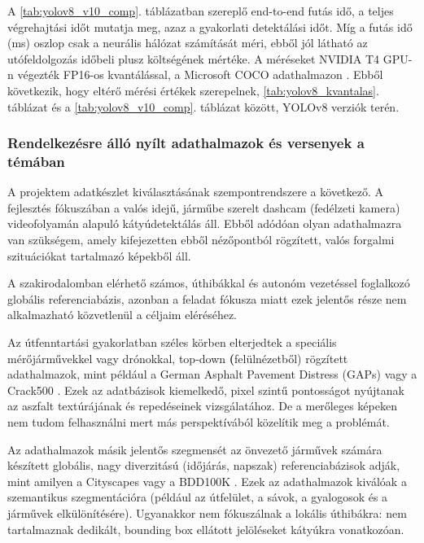 A \ref{tab:yolov8_v10_comp}. táblázatban szereplő end-to-end futás
idő, a teljes végrehajtási időt mutatja meg, azaz a gyakorlati
detektálási időt. Míg a futás idő (ms) oszlop csak a neurális hálózat
számítását méri, ebből jól látható az utófeldolgozás időbeli plusz
költségének mértéke. A méréseket NVIDIA T4 GPU-n végezték FP16-os
kvantálással, a Microsoft COCO adathalmazon \cite{wangYOLOv10RealTimeEndtoEnd2024}. Ebből következik,
hogy eltérő mérési értékek szerepelnek, \ref{tab:yolov8_kvantalas}. táblázat és a \ref{tab:yolov8_v10_comp}. táblázat között, YOLOv8 verziók terén.

\subsubsection{Rendelkezésre álló nyílt adathalmazok és versenyek a témában} %
\label{rendelkezesre-allo-nyilt-adathalmazok-es-versenyek-a-temaban}

A projektem adatkészlet kiválasztásának szempontrendszere a következő. A
fejlesztés fókuszában a valós idejű, járműbe szerelt dashcam (fedélzeti
kamera) videofolyamán alapuló kátyúdetektálás áll. Ebből adódóan olyan
adathalmazra van szükségem, amely kifejezetten ebből nézőpontból
rögzített, valós forgalmi szituációkat tartalmazó képekből áll.

A szakirodalomban elérhető számos, úthibákkal és autonóm vezetéssel
foglalkozó globális referenciabázis, azonban a feladat fókusza miatt
ezek jelentős része nem alkalmazható közvetlenül a céljaim eléréséhez.

Az útfenntartási gyakorlatban széles körben elterjedtek a speciális
mérőjárművekkel vagy drónokkal, top-down \textbf{(}felülnézetből)
rögzített adathalmazok, mint például a German Asphalt Pavement Distress
(GAPs) \cite{wangYOLOv10RealTimeEndtoEnd2024} vagy a Crack500 \cite{yangFeaturePyramidHierarchical2020}. Ezek az adatbázisok kiemelkedő,
pixel szintű pontosságot nyújtanak az aszfalt textúrájának és
repedéseinek vizsgálatához. De a merőleges képeken nem tudom
felhasználni mert más perspektívából közelítik meg a problémát.

Az adathalmazok másik jelentős szegmensét az önvezető járművek számára
készített globális, nagy diverzitású (időjárás, napszak)
referenciabázisok adják, mint amilyen a Cityscapes \cite{cordtsCityscapesDatasetSemantic2016} vagy a
BDD100K \cite{yuBDD100KDiverseDriving2020}. Ezek az adathalmazok kiválóak a szemantikus
szegmentációra (például az útfelület, a sávok, a gyalogosok és a
járművek elkülönítésére). Ugyanakkor nem fókuszálnak a lokális
úthibákra: nem tartalmaznak dedikált, bounding box ellátott jelöléseket
kátyúkra vonatkozóan.

